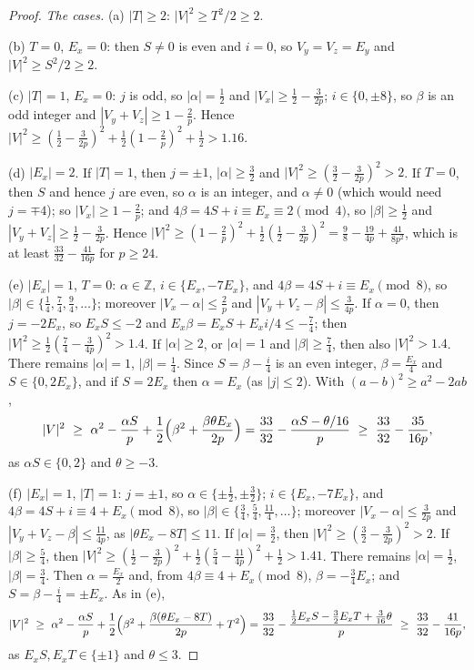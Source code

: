 \documentclass[11pt]{amsart}
\theoremstyle{definition}
\theoremstyle{plain}
\newcommand{\Z}{\mathbb{Z}}
\begin{document}
\begin{proof}
\emph{The cases.} (a) $|T|\ge2$: $|V|^2\ge T^2/2\ge2$.

(b) $T=0$, $E_x=0$: then $S\ne0$ is even and $i=0$, so $V_y=V_z=E_y$ and $|V|^2\ge S^2/2\ge2$.

(c) $|T|=1$, $E_x=0$: $j$ is odd, so $|\alpha|=\frac12$ and $|V_x|\ge\frac12-\frac3{2p}$; $i\in\{0,\pm8\}$, so $\beta$ is an odd integer and $|V_y+V_z|\ge1-\frac2p$. Hence $|V|^2\ge(\frac12-\frac3{2p})^2+\frac12(1-\frac2p)^2+\frac12>1.16$.

(d) $|E_x|=2$. If $|T|=1$, then $j=\pm1$, $|\alpha|\ge\frac32$ and $|V|^2\ge(\frac32-\frac3{2p})^2>2$. If $T=0$, then $S$ and hence $j$ are even, so $\alpha$ is an integer, and $\alpha\ne0$ (which would need $j=\mp4$); so $|V_x|\ge1-\frac2p$; and $4\beta=4S+i\equiv E_x\equiv2\pmod4$, so $|\beta|\ge\frac12$ and $|V_y+V_z|\ge\frac12-\frac3{2p}$. Hence $|V|^2\ge(1-\frac2p)^2+\frac12(\frac12-\frac3{2p})^2=\frac98-\frac{19}{4p}+\frac{41}{8p^2}$, which is at least $\frac{33}{32}-\frac{41}{16p}$ for $p\ge24$.

(e) $|E_x|=1$, $T=0$: $\alpha\in\Z$, $i\in\{E_x,-7E_x\}$, and $4\beta=4S+i\equiv E_x\pmod8$, so $|\beta|\in\{\frac14,\frac74,\frac94,\dots\}$; moreover $|V_x-\alpha|\le\frac2p$ and $|V_y+V_z-\beta|\le\frac3{4p}$. If $\alpha=0$, then $j=-2E_x$, so $E_xS\le-2$ and $E_x\beta=E_xS+E_xi/4\le-\frac74$; then $|V|^2\ge\frac12(\frac74-\frac3{4p})^2>1.4$. If $|\alpha|\ge2$, or $|\alpha|=1$ and $|\beta|\ge\frac74$, then also $|V|^2>1.4$. There remains $|\alpha|=1$, $|\beta|=\frac14$. Since $S=\beta-\frac i4$ is an even integer, $\beta=\frac{E_x}4$ and $S\in\{0,2E_x\}$, and if $S=2E_x$ then $\alpha=E_x$ (as $|j|\le2$). With $(a-b)^2\ge a^2-2ab$,
\[
|V|^2\ \ge\ \alpha^2-\frac{\alpha S}p+\frac12\Bigl(\beta^2+\frac{\beta\theta E_x}{2p}\Bigr)=\frac{33}{32}-\frac{\alpha S-\theta/16}p\ \ge\ \frac{33}{32}-\frac{35}{16p},
\]
as $\alpha S\in\{0,2\}$ and $\theta\ge-3$.

(f) $|E_x|=1$, $|T|=1$: $j=\pm1$, so $\alpha\in\{\pm\frac12,\pm\frac32\}$; $i\in\{E_x,-7E_x\}$, and $4\beta=4S+i\equiv4+E_x\pmod8$, so $|\beta|\in\{\frac34,\frac54,\frac{11}4,\dots\}$; moreover $|V_x-\alpha|\le\frac3{2p}$ and $|V_y+V_z-\beta|\le\frac{11}{4p}$, as $|\theta E_x-8T|\le11$. If $|\alpha|=\frac32$, then $|V|^2\ge(\frac32-\frac3{2p})^2>2$. If $|\beta|\ge\frac54$, then $|V|^2\ge(\frac12-\frac3{2p})^2+\frac12(\frac54-\frac{11}{4p})^2+\frac12>1.41$. There remains $|\alpha|=\frac12$, $|\beta|=\frac34$. Then $\alpha=\frac{E_x}2$ and, from $4\beta\equiv4+E_x\pmod 8$, $\beta=-\frac34E_x$; and $S=\beta-\frac i4=\pm E_x$. As in (e),
\[
|V|^2\ \ge\ \alpha^2-\frac{\alpha S}p+\frac12\Bigl(\beta^2+\frac{\beta(\theta E_x-8T)}{2p}+T^2\Bigr)=\frac{33}{32}-\frac{\frac12E_xS-\frac32E_xT+\frac3{16}\theta}{p}\ \ge\ \frac{33}{32}-\frac{41}{16p},
\]
as $E_xS,E_xT\in\{\pm1\}$ and $\theta\le3$.


\end{proof}
\end{document}
